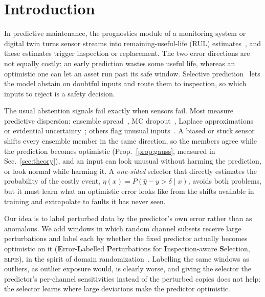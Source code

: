 \documentclass{esannV2}
\newcommand{\RPT}{\textsc{elpis}}
\begin{document}
\section{Introduction}
In predictive maintenance, the prognostics module of a monitoring system or digital twin turns sensor streams into remaining-useful-life (RUL) estimates~\cite{saxena2008damage}, and these estimates trigger inspection or replacement. The two error directions are not equally costly: an early prediction wastes some useful life, whereas an optimistic one can let an asset run past its safe window. Selective prediction~\cite{chow1970optimum,geifman2017selective,zaoui2020regression,jiang2020riskcontrolled} lets the model abstain on doubtful inputs and route them to inspection, so which inputs to reject is a safety decision.

The usual abstention signals fail exactly when sensors fail. Most measure predictive dispersion: ensemble spread~\cite{lakshminarayanan2017simple}, MC dropout~\cite{gal2016dropout}, Laplace approximations~\cite{daxberger2021laplace} or evidential uncertainty~\cite{amini2020deep}; others flag unusual inputs~\cite{lee2018simple,sun2022out,liu2008isolation}. A biased or stuck sensor shifts every ensemble member in the same direction, so the members agree while the prediction becomes optimistic (Prop.~\ref{prop:gauss}, measured in Sec.~\ref{sec:theory}), and an input can look unusual without harming the prediction, or look normal while harming it. A \emph{one-sided} selector that directly estimates the probability of the costly event, $\eta(x)=P(\hat y-y>\delta\mid x)$, avoids both problems, but it must learn what an optimistic error looks like from the shifts available in training and extrapolate to faults it has never seen.

Our idea is to label perturbed data by the predictor's own error rather than as anomalous. We add windows in which random channel subsets receive large perturbations and label each by whether the fixed predictor actually becomes optimistic on it (\textbf{E}rror-\textbf{L}abelled \textbf{P}erturbations for \textbf{I}nspection-aware \textbf{S}election, \RPT), in the spirit of domain randomization~\cite{tobin2017domain}. Labelling the same windows as outliers, as outlier exposure would, is clearly worse, and giving the selector the predictor's per-channel sensitivities instead of the perturbed copies does not help: the selector learns where large deviations make the predictor optimistic.
\end{document}
